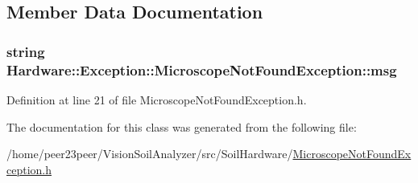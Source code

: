 \subsection{Member Data Documentation}
\hypertarget{class_hardware_1_1_exception_1_1_microscope_not_found_exception_ae8ac712f31fe28bba8946710521e8926}{}
\subsubsection[{msg}]{\setlength{\rightskip}{0pt plus 5cm}string Hardware\+::\+Exception\+::\+Microscope\+Not\+Found\+Exception\+::msg\hspace{0.3cm}{\ttfamily [private]}}\label{class_hardware_1_1_exception_1_1_microscope_not_found_exception_ae8ac712f31fe28bba8946710521e8926}


Definition at line 21 of file Microscope\+Not\+Found\+Exception.\+h.



The documentation for this class was generated from the following file\+:\begin{DoxyCompactItemize}
\item 
/home/peer23peer/\+Vision\+Soil\+Analyzer/src/\+Soil\+Hardware/\hyperlink{_microscope_not_found_exception_8h}{Microscope\+Not\+Found\+Exception.\+h}\end{DoxyCompactItemize}
